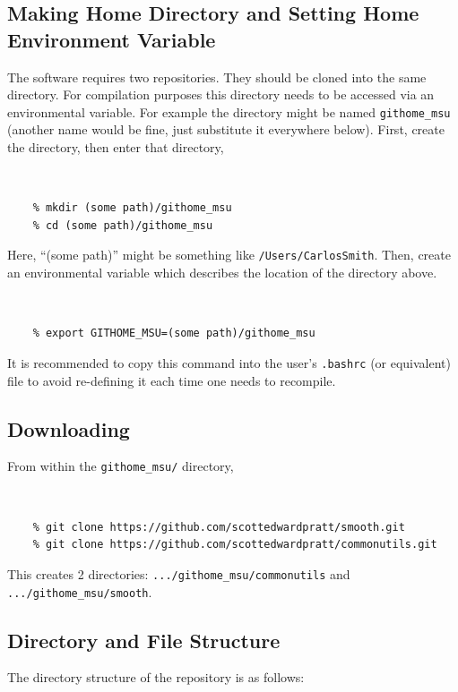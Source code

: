 \documentclass[main.tex]{subfiles}
\begin{document}
\subsection{Making Home Directory and Setting Home Environment Variable}

The software requires two repositories. They should be cloned into the same directory. For compilation purposes this directory needs to be accessed via an environmental variable.  For example the directory might be named {\tt githome\_msu} (another name would be fine, just substitute it everywhere below). First, create the directory, then enter that directory,\\
\vspace{-20pt}
{\tt 
\begin{verbatim}
    % mkdir (some path)/githome_msu
    % cd (some path)/githome_msu
\end{verbatim}
}
Here, ``(some path)'' might be something like {\tt /Users/CarlosSmith}. Then, create an environmental variable which describes the location of the directory above.\\
\vspace{-20pt}
{\tt 
\begin{verbatim}
    % export GITHOME_MSU=(some path)/githome_msu
\end{verbatim}
}
It is recommended to copy this command into the user's {\tt .bashrc} (or equivalent) file to avoid re-defining it each time one needs to recompile.

\subsection{Downloading}\label{sec:Downloading_Compiling}
From within the {\tt githome\_msu/} directory,\\
\vspace{-20pt}
{\tt 
\begin{verbatim}
    % git clone https://github.com/scottedwardpratt/smooth.git
    % git clone https://github.com/scottedwardpratt/commonutils.git
\end{verbatim}
}

This creates 2 directories: {\tt .../githome\_msu/commonutils} and {\tt .../githome\_msu/smooth}.

\subsection{Directory and File Structure}

The directory structure of the repository is as follows: 
\end{document}
